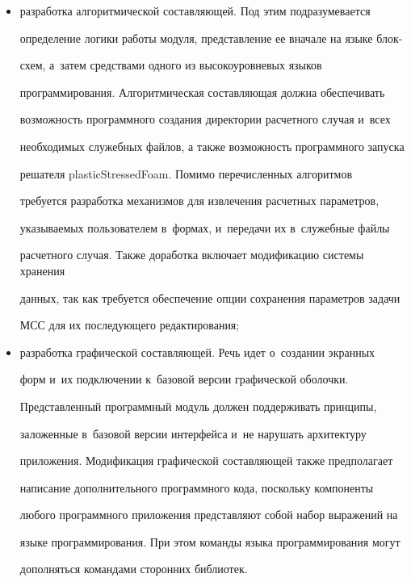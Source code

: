    \begin{itemize}


\item разработка алгоритмической составляющей. Под этим подразумевается 


определение логики работы модуля, пред\-став\-ле\-ние ее вначале на языке блок-


схем, а~затем средствами одного из высокоуровневых языков 


программирования. Алгоритмическая составляющая долж\-на обеспечивать 


возможность программного создания директории расчетного случая и~всех 


необходимых служебных файлов, а также возможность программного запуска 


решателя \mbox{plasticStressedFoam}. Помимо перечисленных алгоритмов 


требуется разработка механизмов для извлечения расчетных параметров, 


указываемых пользователем в~формах, и~передачи их в~служебные файлы 


расчетного случая. Также доработка включает модификацию системы хранения 


данных, так как требуется обеспечение опции сохранения параметров задачи 


МСС для их последующего редактирования;


\item разработка графической составляющей. Речь идет о~создании экранных 


форм и~их подключении к~базовой версии графической оболочки. 


Представленный программный модуль должен поддерживать принципы, 


заложенные в~базовой версии интерфейса и~не нарушать архитектуру 


приложения. Модификация графической составляющей также предполагает 


написание дополнительного программного кода, поскольку компоненты 


любого программного приложения представляют собой набор выражений на 


языке программирования. При этом команды языка программирования могут 


дополняться командами сторонних библиотек.


\end{itemize}





